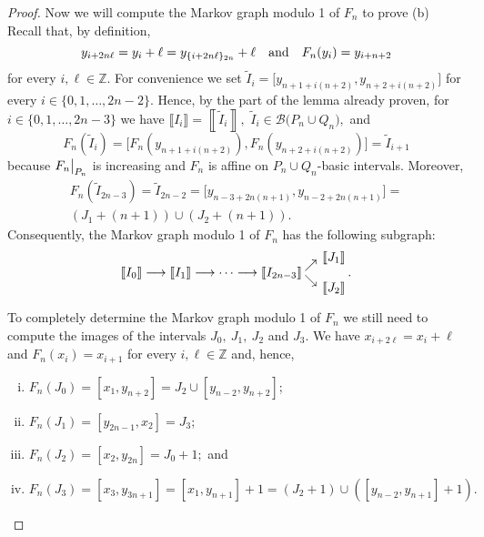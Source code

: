 \documentclass[a4paper, 11pt]{amsart}
\numberwithin{equation}{section}
\theoremstyle{customnumberedtheorem}
\theoremstyle{definitionwithbfnote}
\newcommand{\Z}{\ensuremath{\mathbb{Z}}}
\newcommand{\BIclass}[1]{\ensuremath{\llbracket #1\rrbracket}}
\def\calB{\mathcal{B}}
\newcommand{\bigSBI}[1]{\ensuremath{\calB\bigl(#1\bigr)}}
\newcommand{\andq}[1][and]{\ensuremath{\quad\text{#1}\quad}}
\newcommand{\modulo}[2]{\{#1\}\sb{#2}}
\newcommand{\evalat}[1]{\bigr\rvert\sb{#1}}
\begin{document}
\begin{proof}
Now we will compute the Markov graph modulo 1 of $F_n$ to prove (b)
Recall that, by definition,
\[
  y_{i + 2n\ell} = y_i + \ell = y_{\modulo{i + 2n\ell}{2n}} + \ell
  \andq
  F_n(y_i) = y_{i+n+2}
\]
for every $i,\ell \in \Z.$
For convenience we set
$\widetilde{I}_i = \bigl[y_{n+1+i(n+2)}, y_{n+2+i(n+2)}\bigr]$
for every $i \in \{0,1,\dots,2n-2\}.$
Hence, by the part of the lemma already proven,
for $i \in \{0,1,\dots,2n-3\}$ we have
$\BIclass{I_i} =  \left\llbracket\widetilde{I}_i\right\rrbracket,$
$\widetilde{I}_i \in \bigSBI{P_n \cup Q_n},$ and
\begin{equation}\label{images}
 F_n\left(\widetilde{I}_i\right) =
 \bigl[F_n(y_{n+1+i(n+2)}), F_n(y_{n+2+i(n+2)})\bigr] =
 \widetilde{I}_{i+1}
\end{equation}
because $F_n\evalat{P_n}$ is increasing and
$F_n$ is affine on $P_n \cup Q_n$-basic intervals.
Moreover,
\begin{multline*}
 F_n\left(\widetilde{I}_{2n-3}\right) = \widetilde{I}_{2n-2} =
   \bigl[y_{n-3 + 2n(n+1)}, y_{n-2 + 2n(n+1)}\bigr] = \\
   (J_1 + (n+1)) \cup (J_2 + (n+1)).
\end{multline*}
Consequently, the Markov graph modulo 1 of $F_n$ has the following
subgraph:
\begin{equation}\label{fundamentaloop} \arraycolsep=2pt
 \BIclass{I_0} \longrightarrow \BIclass{I_1} \longrightarrow \cdots
 \longrightarrow \BIclass{I_{2n-3}}
 \begin{array}{ll} \nearrow & \raisebox{6pt}{\BIclass{J_1}}\\ \searrow & \raisebox{-6pt}{\BIclass{J_2}} \end{array}.
\end{equation}

To completely determine the Markov graph modulo 1 of $F_n$
we still need to compute the images of the intervals
$J_0,\ J_1,\ J_2$ and $J_3.$
We have $x_{i + 2\ell} = x_i + \ell$ and $F_n(x_i) = x_{i+1}$
for every $i,\ell \in \Z$ and, hence,
\begin{enumerate}[(i)]
\item $F_n(J_0) = [x_1, y_{n+2}] = J_2 \cup [y_{n-2}, y_{n+2}]$;
\item $F_n(J_1) = [y_{2n-1}, x_2] = J_3$;
\item $F_n(J_2) = [x_2, y_{2n}] = J_0 + 1;$ and
\item $F_n(J_3) = [x_3,y_{3n+1}] = [x_1,y_{n+1}] + 1 = (J_2 + 1) \cup ([y_{n-2}, y_{n+1}] + 1).$
\end{enumerate}


\end{proof}
\end{document}
